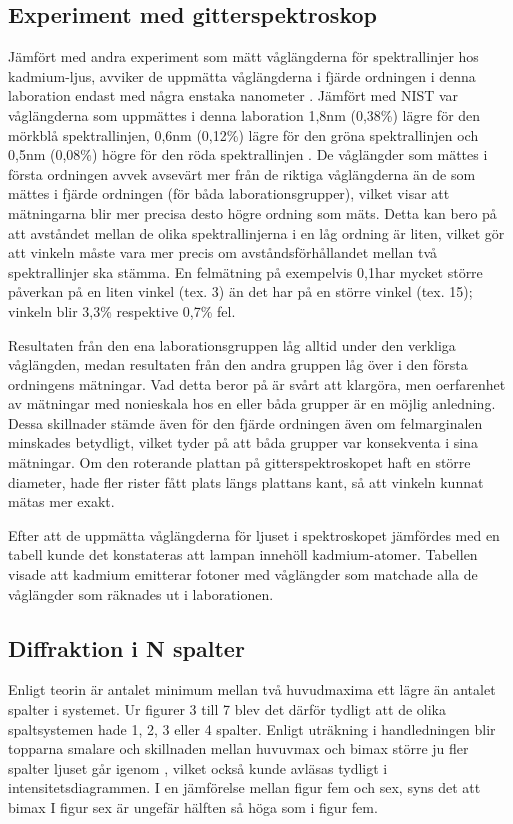 \documentclass[conference]{IEEEtran}
\begin{document}
\subsection{Experiment med gitterspektroskop}
Jämfört med andra experiment som mätt våglängderna för spektrallinjer hos kadmium-ljus, avviker de uppmätta våglängderna i fjärde ordningen i denna laboration endast med några enstaka nanometer \cite{NIST}. Jämfört med NIST var våglängderna som uppmättes i denna laboration 1,8nm (0,38\%) lägre för den mörkblå spektrallinjen, 0,6nm (0,12\%) lägre för den gröna spektrallinjen och 0,5nm (0,08\%) högre för den röda spektrallinjen \cite{NIST}. De våglängder som mättes i första ordningen avvek avsevärt mer från de riktiga våglängderna än de som mättes i fjärde ordningen (för båda laborationsgrupper), vilket visar att mätningarna blir mer precisa desto högre ordning som mäts. Detta kan bero på att avståndet mellan de olika spektrallinjerna i en låg ordning är liten, vilket gör att vinkeln måste vara mer precis om avståndsförhållandet mellan två spektrallinjer ska stämma. En felmätning på exempelvis 0,1\degree har mycket större påverkan på en liten vinkel (tex. 3\degree) än det har på en större vinkel (tex. 15\degree); vinkeln blir 3,3\% respektive 0,7\% fel. 

Resultaten från den ena laborationsgruppen låg alltid under den verkliga våglängden, medan resultaten från den andra gruppen låg över i den första ordningens mätningar. Vad detta beror på är svårt att klargöra, men oerfarenhet av mätningar med nonieskala hos en eller båda grupper är en möjlig anledning. Dessa skillnader stämde även för den fjärde ordningen även om felmarginalen minskades betydligt, vilket tyder på att båda grupper var konsekventa i sina mätningar. Om den roterande plattan på gitterspektroskopet haft en större diameter, hade fler rister fått plats längs plattans kant, så att vinkeln kunnat mätas mer exakt. 

Efter att de uppmätta våglängderna för ljuset i spektroskopet jämfördes med en tabell kunde det konstateras att lampan innehöll kadmium-atomer. Tabellen visade att kadmium emitterar fotoner med våglängder som matchade alla de våglängder som räknades ut i laborationen. 

\subsection{Diffraktion i N spalter}
Enligt teorin är antalet minimum mellan två huvudmaxima ett lägre än antalet spalter i systemet. Ur figurer 3 till 7 blev det därför tydligt att de olika spaltsystemen hade 1, 2, 3 eller 4 spalter. Enligt uträkning i handledningen blir topparna smalare och skillnaden mellan huvuvmax och bimax större ju fler spalter ljuset går igenom \cite{Handledningen}, vilket också kunde avläsas tydligt i intensitetsdiagrammen. I en jämförelse mellan figur fem och sex, syns det att bimax I figur sex är ungefär hälften så höga som i figur fem. 
\end{document}
